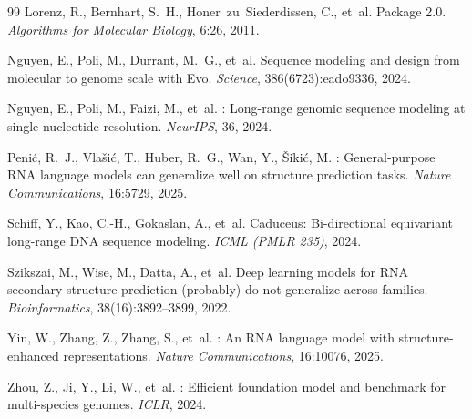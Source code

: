\documentclass[11pt]{article}
\begin{document}
\begin{thebibliography}{99}
Lorenz, R., Bernhart, S.~H., Honer~zu~Siederdissen, C., et~al.
 Package 2.0.
\newblock \emph{Algorithms for Molecular Biology}, 6:26, 2011.

Nguyen, E., Poli, M., Durrant, M.~G., et~al.
\newblock Sequence modeling and design from molecular to genome scale with
  {E}vo.
\newblock \emph{Science}, 386(6723):eado9336, 2024.

Nguyen, E., Poli, M., Faizi, M., et~al.
: Long-range genomic sequence modeling at single nucleotide
  resolution.
\newblock \emph{NeurIPS}, 36, 2024.

Peni\'{c}, R.~J., Vla\v{s}i\'{c}, T., Huber, R.~G., Wan, Y.,
  \v{S}iki\'{c}, M.
: General-purpose {RNA} language models can generalize well
  on structure prediction tasks.
\newblock \emph{Nature Communications}, 16:5729, 2025.

Schiff, Y., Kao, C.-H., Gokaslan, A., et~al.
\newblock Caduceus: Bi-directional equivariant long-range {DNA} sequence
  modeling.
\newblock \emph{ICML (PMLR 235)}, 2024.

Szikszai, M., Wise, M., Datta, A., et~al.
\newblock Deep learning models for {RNA} secondary structure prediction
  (probably) do not generalize across families.
\newblock \emph{Bioinformatics}, 38(16):3892--3899, 2022.

Yin, W., Zhang, Z., Zhang, S., et~al.
: An {RNA} language model with structure-enhanced
  representations.
\newblock \emph{Nature Communications}, 16:10076, 2025.

Zhou, Z., Ji, Y., Li, W., et~al.
: Efficient foundation model and benchmark for
  multi-species genomes.
\newblock \emph{ICLR}, 2024.

\end{thebibliography}
\end{document}
